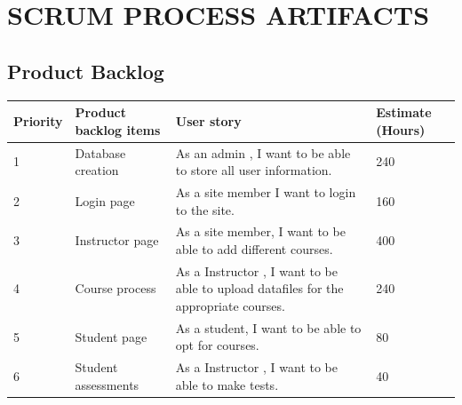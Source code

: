 \chapter{SCRUM PROCESS ARTIFACTS}
%
\section{Product Backlog}
%
%
\renewcommand{\arraystretch}{1.25}
\begin{center}
\begin{tabular}{|m{}|m{}|m{}|m{}|}
\hline
{\bf Priority} & {\bf Product backlog items} & {\bf User story} & {\bf Estimate (Hours)}\\
\hline
1 & Database creation & As an admin , I want to be able to store all user information.  & 240 \\
\hline
2 & Login page & As a site member I want to login to the site. & 160 \\
\hline
3 & Instructor  page & As a site member, I want to be able to add different courses. & 400\\
\hline
4 & Course  process & As a Instructor , I want to be able to upload datafiles for the appropriate courses. & 240\\
\hline
5 & Student page & As a student, I want to be able to opt for courses. & 80 \\
\hline
6 & Student assessments & As a Instructor , I want to be able to make tests. & 40\\
\hline
\end{tabular}
\end{center}
\renewcommand{\arraystretch}{1}
%
%
